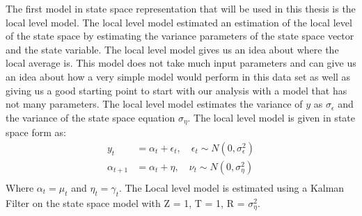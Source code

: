 
The first model in state space representation that will be used in this thesis is the local level model. The local level model estimated an estimation of the local level of the state space by estimating the variance parameters of the state space vector and the state variable. The local level model gives us an idea about where the local average is. This model does not take much input parameters and can give us an idea about how a very simple model would perform in this data set as well as giving us a good starting point to start with our analysis with a model that has not many parameters. The local level model estimates the variance of $y$ as $\sigma_{\epsilon}$ and the variance of the state space equation $\sigma_{\eta}$. The local level model is given in state space form as:
\begin{equation}
\begin{split}
    y_t &= \alpha_t + \epsilon_t, \quad \epsilon_t \sim N(0,\sigma_\epsilon^2)\\
    \alpha_{t+1} &= \alpha_t + \eta, \quad \nu_t \sim N(0, \sigma_\eta^2)\\
\end{split}
\end{equation}
Where $\alpha_t = \mu_t$ and $\eta_t = \gamma_t$. The Local level model is estimated using a Kalman Filter on the state space model with Z = 1, T = 1, R = $\sigma_\eta^2$.\\

